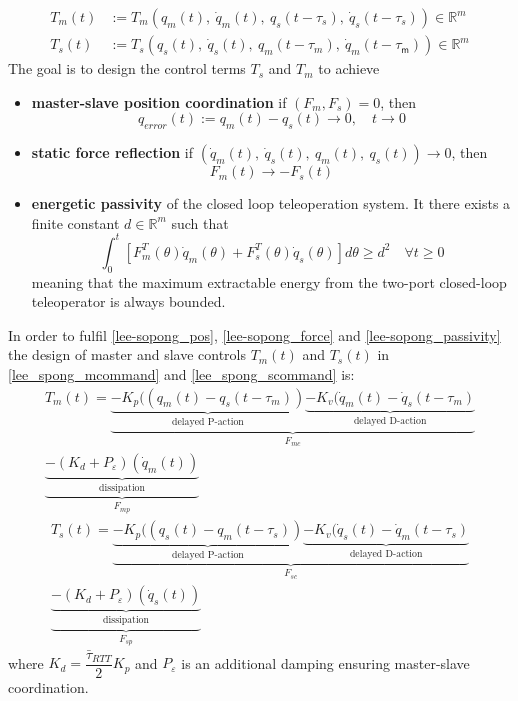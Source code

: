 \begin{align}\label{lee_spong_mcommand}
	T_{m}(t)&:=  T_{m} \left( q_{m}(t), \ \dot{q}_{m}(t), \ q_{s}(t - \tau_{s}), \ \dot{q}_{s}(t - \tau_{s})  \right) \in \mathbb{R}^m \\
	\label{lee_spong_scommand}
	T_{s}(t)&:= T_{s}\left( q_{s}(t), \ \dot{q}_{s}(t), \  q_{m}(t - \tau_{m}), \ \dot{q}_{m}(t - \tau_{\textsf{m}})  \right) \in \mathbb{R}^m
\end{align}
The goal is to design the control terms $T_{s}$ and $T_{m}$ to achieve
\begin{itemize}
	\item \textbf{master-slave position coordination} if $(F_{m},F_{s} )= 0$, then
	\begin{equation}\label{lee-sopong_pos}
		q_{error}(t):= q_{m}(t) - q_{s}(t) \rightarrow0, \quad t\rightarrow 0
	\end{equation}
	\item  \textbf{static force reflection} if $(\dot{q}_{m}(t),\  \dot{q}_{s}(t), \ q_{m}(t), \ q_{s}(t)) \rightarrow 0$, then
	\begin{equation}\label{lee-sopong_force}
	F_{m}(t) \rightarrow -F_{s}(t)
	\end{equation}
	\item \textbf{energetic passivity} of the closed loop teleoperation system. It there exists a finite constant $d \in \mathbb{R}^m$ such that
	\begin{equation}\label{lee-sopong_passivity}
	\int_{0}^{t}\left[ F^{T}_{m}(\theta) \dot{q}_{m}(\theta)+ F^{T}_{s}(\theta) \dot{q}_{s}(\theta)\right] d\theta \geq d^{2} \quad \forall t\geq 0
	\end{equation}
	meaning that the maximum extractable energy from the two-port closed-loop teleoperator is always bounded.
\end{itemize}
In order to fulfil \eqref{lee-sopong_pos}, \eqref{lee-sopong_force} and \eqref{lee-sopong_passivity}
the design of master and slave controls $T_{m}(t)$ and $T_{s}(t)$ in \eqref{lee_spong_mcommand} and \eqref{lee_spong_scommand} is:
\begin{multline}
	T_{m}(t) = \underbrace{
						\underbrace{
							-K_{p}((q_{m}(t) - q_{s}(t-\tau_{m}))
						}_{\text{delayed P-action}}
						\underbrace{
							-K_{v}(\dot{q}_{m}(t) - \dot{q}_{s}(t-\tau_{m})
						}_{\text{delayed D-action}}
					}_{F_{mc}}\\
					\underbrace{
						\underbrace{
							-\left( K_{d}+P_{\varepsilon}\right)(\dot{q}_{m}(t))
						}_{\text{dissipation}}
					}_{F_{mp}
				}
\end{multline}
\begin{multline}
	T_{s}(t) = \underbrace{
		\underbrace{
			-K_{p}((q_{s}(t) - q_{m}(t-\tau_{s}))
		}_{\text{delayed P-action}}
		\underbrace{
			-K_{v}(\dot{q}_{s}(t) - \dot{q}_{m}(t-\tau_{s})
		}_{\text{delayed D-action}}
		}_{F_{sc}}\\
		\underbrace{
			\underbrace{
					-\left( K_{d}+P_{\varepsilon}\right)(\dot{q}_{s}(t))
			}_{\text{dissipation}}
		}_{F_{sp}}
\end{multline}
where $K_{d}= \dfrac{\bar{\tau}_{RTT}}{2} K_{p}$ and $P_{\varepsilon}$ is an additional damping ensuring master-slave coordination.
